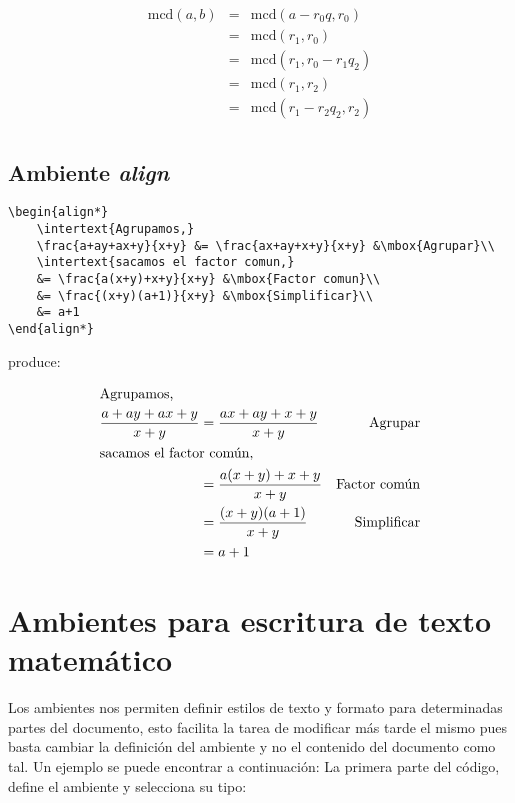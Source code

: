 \documentclass[a4,10pt]{aleph-notas}
\theoremstyle{definition}
\theoremstyle{plain}
\begin{document}
\begin{eqnarray} %
\mbox{mcd}(a,b) & = & \mbox{mcd}(a-r_0q,r_0) \\[0.2cm]
& = & \mbox{mcd}(r_1,r_0) \\[0.2cm]\nonumber
& = & \mbox{mcd}(r_1,r_0-r_1q_2)\\[0.2cm]
& = & \mbox{mcd}(r_1,r_2) \\[0.2cm]
& = & \mbox{mcd}(r_1-r_2q_2,r_2)\\[0.2cm]
\end{eqnarray}

\subsection{Ambiente \emph{align}}

\begin{lstlisting}[frame=single]
\begin{align*}
    \intertext{Agrupamos,}
    \frac{a+ay+ax+y}{x+y} &= \frac{ax+ay+x+y}{x+y} &\mbox{Agrupar}\\
    \intertext{sacamos el factor comun,}
    &= \frac{a(x+y)+x+y}{x+y} &\mbox{Factor comun}\\
    &= \frac{(x+y)(a+1)}{x+y} &\mbox{Simplificar}\\
    &= a+1
\end{align*}
\end{lstlisting}

\noindent
produce:

\begin{align*}
\intertext{Agrupamos,}
\frac{a+ay+ax+y}{x+y} &= \frac{ax+ay+x+y}{x+y} &\mbox{Agrupar}\\
\intertext{sacamos el factor común,}
&= \frac{a(x+y)+x+y}{x+y} &\mbox{Factor común}\\
&= \frac{(x+y)(a+1)}{x+y} &\mbox{Simplificar}\\
&= a+1
\end{align*}

\section{Ambientes para escritura de texto matemático}

Los ambientes nos permiten definir estilos de texto y formato para determinadas partes del documento, esto facilita la tarea de modificar más tarde el mismo pues basta cambiar la definición del ambiente y no el contenido del documento como tal. Un ejemplo se puede encontrar a continuación: La primera parte del código, define el ambiente y selecciona su tipo:
\end{document}
